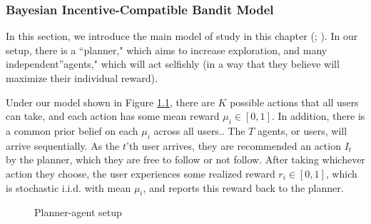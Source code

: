 \documentclass[
  letterpaper,
  numbers=noenddot,
  DIV=11,
  oneside]{scrreprt}
\theoremstyle{remark}
\begin{document}
\subsubsection*{Bayesian Incentive-Compatible Bandit
Model}\label{bayesian-incentive-compatible-bandit-model}

In this section, we introduce the main model of study in this chapter
(;
). In our setup, there is a ``planner," which aims to
increase exploration, and many independent''agents," which will act
selfishly (in a way that they believe will maximize their individual
reward).

Under our model shown in Figure \hyperref[fig-planner-agent]{1.1}, there
are \(K\) possible actions that all users can take, and each action has
some mean reward \(\mu_i \in [0, 1]\). In addition, there is a common
prior belief on each \(\mu_i\) across all users.. The \(T\) agents, or
users, will arrive sequentially. As the \(t\)'th user arrives, they are
recommended an action \(I_t\) by the planner, which they are free to
follow or not follow. After taking whichever action they choose, the
user experiences some realized reward \(r_i \in [0, 1]\), which is
stochastic i.i.d. with mean \(\mu_i\), and reports this reward back to
the planner.

\begin{figure}


\caption{\label{fig-planner-agent}Planner-agent setup}

\end{figure}%
\end{document}
